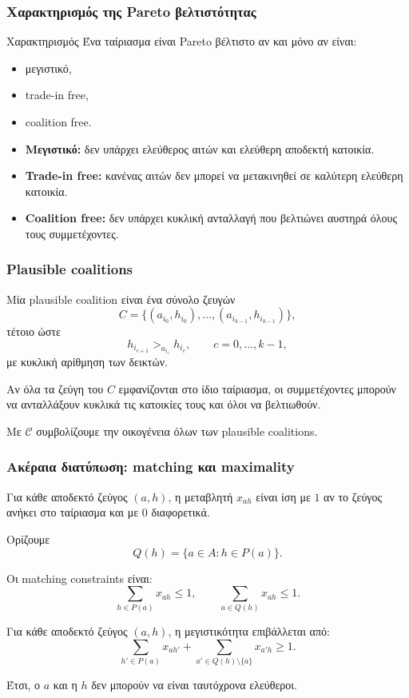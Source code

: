\documentclass{beamer}
\begin{document}
	\begin{frame}
		\frametitle{Χαρακτηρισμός της Pareto βελτιστότητας}
		
		\begin{block}{Χαρακτηρισμός}
			Ένα ταίριασμα είναι Pareto βέλτιστο αν και μόνο αν είναι:
			
			\begin{itemize}
				\item μεγιστικό,
				\item trade-in free,
				\item coalition free.
			\end{itemize}
		\end{block}
		
		\vspace{0.2cm}
		
		\begin{itemize}
			\item \textbf{Μεγιστικό:} δεν υπάρχει ελεύθερος αιτών και ελεύθερη αποδεκτή κατοικία.
			\item \textbf{Trade-in free:} κανένας αιτών δεν μπορεί να μετακινηθεί σε καλύτερη ελεύθερη κατοικία.
			\item \textbf{Coalition free:} δεν υπάρχει κυκλική ανταλλαγή που βελτιώνει αυστηρά όλους τους συμμετέχοντες.
		\end{itemize}
	\end{frame}
	
	\begin{frame}
		\frametitle{Plausible coalitions}
		
		Μία plausible coalition είναι ένα σύνολο ζευγών
		\[
		C=\{(a_{i_0},h_{i_0}),\ldots,(a_{i_{k-1}},h_{i_{k-1}})\},
		\]
		τέτοιο ώστε
		\[
		h_{i_{c+1}}>_{a_{i_c}}h_{i_c},
		\qquad c=0,\ldots,k-1,
		\]
		με κυκλική αρίθμηση των δεικτών.
		
		\vspace{0.3cm}
		
		Αν όλα τα ζεύγη του $C$ εμφανίζονται στο ίδιο ταίριασμα, οι συμμετέχοντες μπορούν να ανταλλάξουν κυκλικά τις κατοικίες τους και όλοι να βελτιωθούν.
		
		Με $\mathcal C$ συμβολίζουμε την οικογένεια όλων των plausible coalitions.
	\end{frame}
	
	\begin{frame}
		\frametitle{Ακέραια διατύπωση: matching και maximality}
		
		Για κάθε αποδεκτό ζεύγος $(a,h)$, η μεταβλητή $x_{ah}$ είναι ίση με $1$ αν το ζεύγος ανήκει στο ταίριασμα και με $0$ διαφορετικά.
		
		Ορίζουμε
		\[
		Q(h)=\{a\in A:h\in P(a)\}.
		\]
		
		Οι matching constraints είναι:
		\[
		\sum_{h\in P(a)}x_{ah}\leq 1,
		\qquad
		\sum_{a\in Q(h)}x_{ah}\leq 1.
		\]
		
		Για κάθε αποδεκτό ζεύγος $(a,h)$, η μεγιστικότητα επιβάλλεται από:
		\[
		\sum_{h'\in P(a)}x_{ah'}
		+
		\sum_{a'\in Q(h)\setminus\{a\}}x_{a'h}
		\geq 1.
		\]
		
		Έτσι, ο $a$ και η $h$ δεν μπορούν να είναι ταυτόχρονα ελεύθεροι.
	\end{frame}
	
\end{document}
